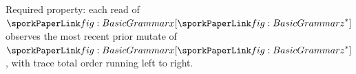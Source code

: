 \begin{figure}[h]
\sporkForceStacktrue
\sporkCodeRule
\centering
\begin{sporkfigure}
  
\end{sporkfigure}
\caption{Required property: each read of $\sporkx[\sporkz^*]$ observes the most recent prior mutate of $\sporkx[\sporkz^*]$, with trace total order running left to right.}
\label{fig:RequiredProperty}
\sporkCodeRule
\end{figure}
